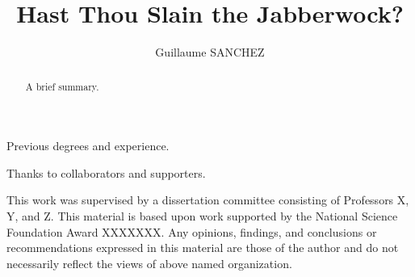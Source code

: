 \documentclass[11pt,leqno]{report}
\begin{document}
\sloppy
\title{Hast Thou Slain the Jabberwock?}
\author{Guillaume SANCHEZ}
\maketitle


\thispagestyle{empty}
\newenvironment{dedication}
{\cleardoublepage \thispagestyle{empty} 
  \begin{center} \em}
  {\end{center}  }
\begin{dedication}


\end{dedication}

\begin{curriculumvitae}

  Previous degrees and experience.

\end{curriculumvitae}

\begin{acknowledgments}

  Thanks to collaborators and supporters.


 
\end{acknowledgments}

\begin{abstract}

  A brief summary.
  
\end{abstract}



\begin{contributors}

This work was supervised by a dissertation committee consisting of Professors
X, Y, and Z. 
This material is based upon work supported by the National Science Foundation Award
XXXXXXX.  Any opinions, findings, and conclusions or recommendations
expressed in this material are those of the author and do not necessarily
reflect the views of above named organization.

\end{contributors}
\end{document}
